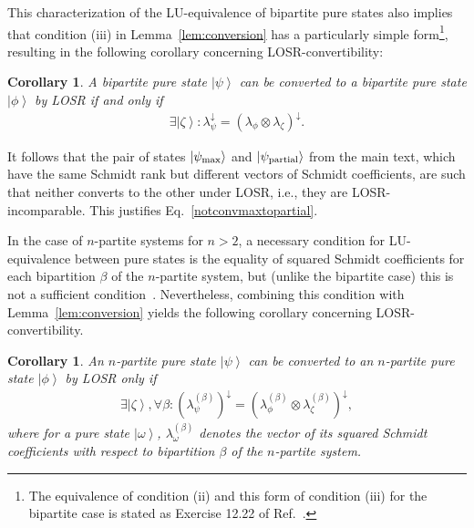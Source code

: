 \documentclass[prx,11pt,letterpaper,twocolumn,accepted=2023-11-27]{quantumarticle}
\newcommand{\ket}[1]{\left| #1 \right>}
\theoremstyle{plain}
\newtheorem{cor}[theo]{Corollary}
\theoremstyle{definition}
\begin{document}
This characterization of the LU-equivalence of bipartite pure states also implies that condition (iii) in Lemma~\ref{lem:conversion} has a particularly simple form\footnote{The equivalence of condition (ii) and this form of condition (iii) for the bipartite case is stated as Exercise 12.22 of Ref.~\cite{NielsenAndChuang}.}, resulting in the following corollary concerning LOSR-convertibility:
\begin{cor}
    \label{cor:bipartite}
    A bipartite pure state $\ket{\psi}$ can be converted to a bipartite pure state $\ket{\phi}$ by LOSR if and only if
    \begin{align}
    \label{eq:bipartite_extension}
    \exists \ket \zeta: \lambda_{\psi}^{\downarrow} = (\lambda_{\phi} \otimes \lambda_{\zeta})^{\downarrow}.
    \end{align}
 \end{cor}

It follows that the pair of states $|\psi_{\rm max}\rangle$ and $|\psi_{\rm partial}\rangle$ from the main text, which have the same Schmidt rank but different vectors of Schmidt coefficients, are such that neither converts to the other under LOSR, i.e., they are LOSR-incomparable. This justifies Eq.~\eqref{notconvmaxtopartial}.


In the case of $n$-partite systems for $n>2$, a necessary condition for LU-equivalence between pure states is
the equality of squared Schmidt coefficients for each bipartition $\beta$ of the $n$-partite system, but (unlike the bipartite case) this is not a sufficient condition~\cite{Kraus2010Local,Acin2001puretriclassify}. 
Nevertheless, combining this condition with Lemma~\ref{lem:conversion} yields the following corollary concerning LOSR-convertibility.


\begin{cor}
    \label{cor:multipartite_extension}
    An $n$-partite pure state $\ket{\psi}$ can be converted to an $n$-partite pure state $\ket{\phi}$ by LOSR only if
    \begin{align}
        \label{eq:multipartite_extension}
\exists \ket \zeta, \forall \beta : (\lambda^{(\beta)}_{\psi})^{\downarrow} = (\lambda^{(\beta)}_{\phi} \otimes \lambda^{(\beta)}_{\zeta})^{\downarrow},
    \end{align}
    where for a pure state $\ket{\omega}$, $\lambda^{(\beta)}_{\omega}$ denotes the vector of its squared Schmidt coefficients 
    with respect to bipartition $\beta$ of the $n$-partite system.
\end{cor}
\end{document}
